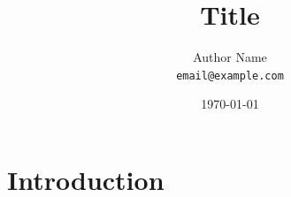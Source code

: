 \documentclass[12pt, a4paper]{article}
\title{Title}
\author{Author Name \\ \texttt{email@example.com}}
\date{\today}
\begin{document}
\maketitle

\begin{abstract}

\end{abstract}

\tableofcontents
\newpage

\section{Introduction}


% 
% 
\end{document}
